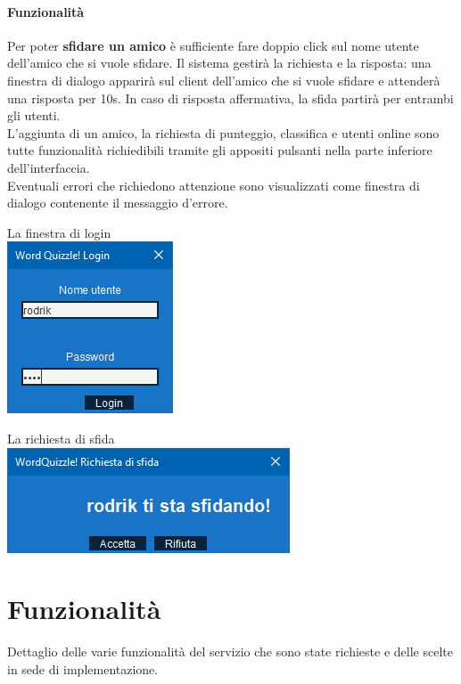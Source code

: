 \documentclass[10pt]{article}
\begin{document}
{\paragraph{Funzionalità} Per poter \textbf{sfidare un amico} è sufficiente fare doppio click sul nome utente dell'amico che si vuole sfidare. Il sistema gestirà la richiesta e la risposta: una finestra di dialogo apparirà sul client dell'amico che si vuole sfidare e attenderà una risposta per 10s. In caso di risposta affermativa, la sfida partirà per entrambi gli utenti.\\
L'aggiunta di un amico, la richiesta di punteggio, classifica e utenti online sono tutte funzionalità richiedibili tramite gli appositi pulsanti nella parte inferiore dell'interfaccia.\\
Eventuali errori che richiedono attenzione sono visualizzati come finestra di dialogo contenente il messaggio d'errore.
\begin{multicols}{2}
\begin{center}
La finestra di login\\
\includegraphics[scale=1]{login.png}
\end{center}
\begin{center}
La richiesta di sfida\\
\includegraphics[scale=1]{sfida.png}
\end{center}
\end{multicols}
\pagebreak
\section{Funzionalità}
Dettaglio delle varie funzionalità del servizio che sono state richieste e delle scelte in sede di implementazione.
}
\end{document}
